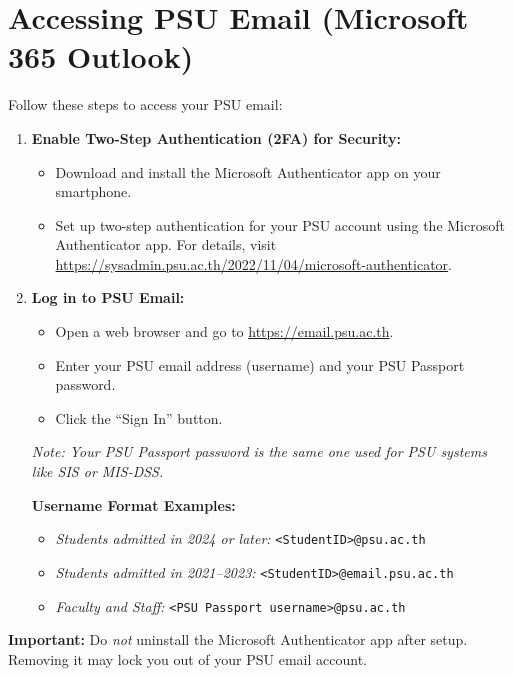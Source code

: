 \documentclass{article}
\begin{document}
\section{Accessing PSU Email (Microsoft 365 Outlook)}
Follow these steps to access your PSU email:

\begin{enumerate}
    \item \textbf{Enable Two-Step Authentication (2FA) for Security:}
    \begin{itemize}
        \item Download and install the Microsoft Authenticator app on your smartphone.
        \item Set up two-step authentication for your PSU account using the Microsoft Authenticator app. For details, visit \url{https://sysadmin.psu.ac.th/2022/11/04/microsoft-authenticator}.
    \end{itemize}

    \item \textbf{Log in to PSU Email:}
    \begin{itemize}
        \item Open a web browser and go to \url{https://email.psu.ac.th}.
        \item Enter your PSU email address (username) and your PSU Passport password.
        \item Click the ``Sign In'' button.
    \end{itemize}
    \textit{Note: Your PSU Passport password is the same one used for PSU systems like SIS or MIS-DSS.}

    \textbf{Username Format Examples:}
    \begin{itemize}
        \item \textit{Students admitted in 2024 or later:} \texttt{<StudentID>@psu.ac.th} 
        \item \textit{Students admitted in 2021--2023:} \texttt{<StudentID>@email.psu.ac.th}
        \item \textit{Faculty and Staff:} \texttt{<PSU Passport username>@psu.ac.th}
    \end{itemize}
\end{enumerate}

\textbf{Important:} Do \emph{not} uninstall the Microsoft Authenticator app after setup. 
Removing it may lock you out of your PSU email account.
\end{document}
